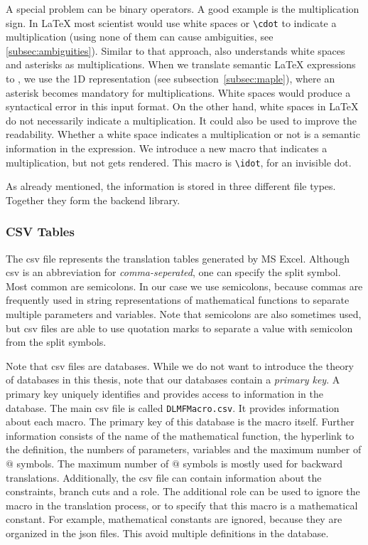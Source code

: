 A special problem can be binary operators. A good example is the multiplication sign. In \LaTeX{} most scientist would use white spaces or \verb|\cdot| to indicate a multiplication (using none of them can cause ambiguities, see \ref{subsec:ambiguities}). Similar to that approach, \Mathematica{} also understands white spaces and asterisks as multiplications. When we translate semantic \LaTeX{} expressions to \Maple, we use the {\sf 1D \Maple{}} representation (see subsection~\ref{subsec:maple}), where an asterisk becomes mandatory for multiplications. White spaces would produce a syntactical error in this input format. On the other hand, white spaces in \LaTeX{} do not necessarily indicate a multiplication. It could also be used to improve the readability. Whether a white space indicates a multiplication or not is a semantic information in the expression. We introduce a new \DLMF{} macro that indicates a multiplication, but not gets rendered. This macro is \verb|\idot|, for an invisible dot.

As already mentioned, the information is stored in three different file types. Together they form the backend library.

\subsubsection{CSV Tables}
The \gls{csv} file represents the translation tables generated by MS Excel. Although \gls{csv} is an abbreviation for \textit{comma-seperated}, one can specify the split symbol. Most common are semicolons. In our case we use semicolons, because commas are frequently used in string representations of mathematical functions to separate multiple parameters and variables. Note that semicolons are also sometimes used, but \gls{csv} files are able to use quotation marks to separate a value with semicolon from the split symbols.

Note that \gls{csv} files are databases. While we do not want to introduce the theory of databases in this thesis, note that our databases contain a \textit{primary key}. A primary key uniquely identifies and provides access to information in the database. The main \gls{csv} file is called \verb|DLMFMacro.csv|. It provides information about each macro. The primary key of this database is the macro itself. Further information consists of the name of the mathematical function, the hyperlink to the \DLMF{} definition, the numbers of parameters, variables and the maximum number of $@$ symbols. The maximum number of $@$ symbols is mostly used for backward translations. Additionally, the \gls{csv} file can contain information about the constraints, branch cuts and a role. The additional role can be used to ignore the macro in the translation process, or to specify that this macro is a mathematical constant. For example, mathematical constants are ignored, because they are organized in the \gls{json} files. This avoid multiple definitions in the database.

